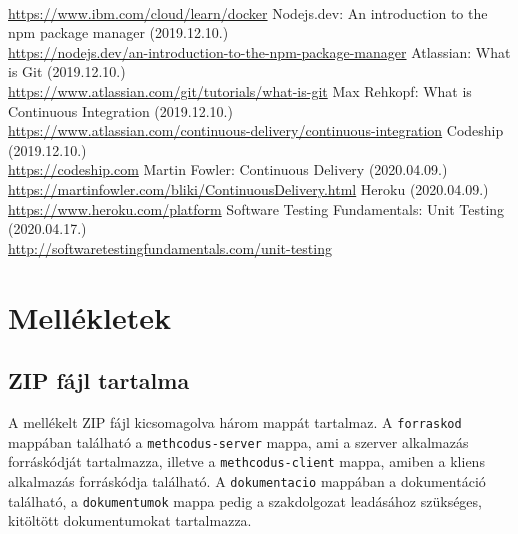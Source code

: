 \documentclass{elteikthesis}
\begin{document}
\begin{thebibliography}{99}
			\\\url{https://www.ibm.com/cloud/learn/docker}
			Nodejs.dev: An introduction to the npm package manager (2019.12.10.)
			\\\url{https://nodejs.dev/an-introduction-to-the-npm-package-manager}
			Atlassian: What is Git (2019.12.10.)
			\\\url{https://www.atlassian.com/git/tutorials/what-is-git}
			Max Rehkopf: What is Continuous Integration (2019.12.10.)
			\\\url{https://www.atlassian.com/continuous-delivery/continuous-integration}
			Codeship (2019.12.10.)
			\\\url{https://codeship.com}
			Martin Fowler: Continuous Delivery (2020.04.09.)
			\\\url{https://martinfowler.com/bliki/ContinuousDelivery.html}
			Heroku (2020.04.09.)
			\\\url{https://www.heroku.com/platform}
			Software Testing Fundamentals: Unit Testing (2020.04.17.)
			\\\url{http://softwaretestingfundamentals.com/unit-testing}

	\end{thebibliography}
	
	\chapter*{Mellékletek}


	\section*{ZIP fájl tartalma}
		A mellékelt ZIP fájl kicsomagolva három mappát tartalmaz. A \texttt{forraskod} mappában található a \texttt{methcodus-server} mappa, ami a szerver alkalmazás forráskódját tartalmazza, illetve a \texttt{methcodus-client} mappa, amiben a kliens alkalmazás forráskódja található. A \texttt{dokumentacio} mappában a dokumentáció található, a \texttt{dokumentumok} mappa pedig a szakdolgozat leadásához szükséges, kitöltött dokumentumokat tartalmazza.
\end{document}
